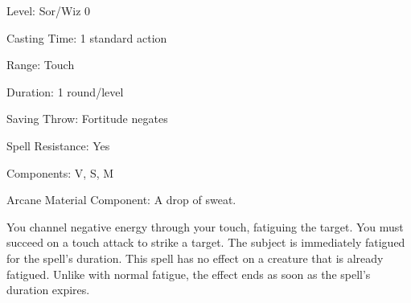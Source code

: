 
\begin{description*}
\item[Level:] Sor/Wiz 0
\item[Casting Time:] 1 standard action
\item[Range:] Touch
\item[Duration:] 1 round/level
\item[Saving Throw:] Fortitude negates
\item[Spell Resistance:] Yes
\item[Components:] V, S, M
\item[Arcane Material Component:] A drop of sweat.
\end{description*}

You channel negative energy through your touch, fatiguing the target. You must
succeed on a touch attack to strike a target.
The subject is immediately fatigued for the spell's duration.
This spell has no effect on a creature that is already fatigued. Unlike with normal
fatigue, the effect ends as soon as the spell's duration expires.